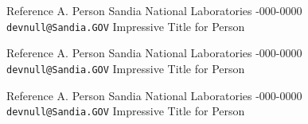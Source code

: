 \documentclass[margin,line,11pt,draft]{res}
\begin{document}
\begin{resume}
{%
Reference A. Person \newline
Sandia National Laboratories -000-0000 \newline
{\tt devnull@Sandia.GOV} \newline
Impressive Title for Person



%
Reference A. Person \newline
Sandia National Laboratories -000-0000 \newline
{\tt devnull@Sandia.GOV} \newline
Impressive Title for Person



%
Reference A. Person \newline
Sandia National Laboratories -000-0000 \newline
{\tt devnull@Sandia.GOV} \newline
Impressive Title for Person



}


\end{resume}
\end{document}

